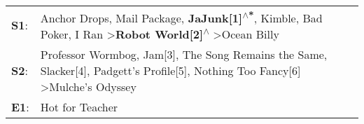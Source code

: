 \begin{supertabular}{p{0.03\textwidth}p{0.92\textwidth}}
 \textbf{S1}:  &  Anchor Drops\textsuperscript{}, \enspace Mail Package\textsuperscript{}, \enspace \textbf{JaJunk[1]\textsuperscript{$\wedge$*}}, \enspace Kimble\textsuperscript{}, \enspace Bad Poker\textsuperscript{}, \enspace I Ran\textsuperscript{} \textgreater \enspace \textbf{Robot World[2]\textsuperscript{$\wedge$}} \textgreater \enspace Ocean Billy\textsuperscript{}  \enspace  \\
 \textbf{S2}:  &                                          Professor Wormbog\textsuperscript{}, \enspace Jam[3]\textsuperscript{}, \enspace The Song Remains the Same\textsuperscript{}, \enspace Slacker[4]\textsuperscript{}, \enspace Padgett's Profile[5]\textsuperscript{}, \enspace Nothing Too Fancy[6]\textsuperscript{} \textgreater \enspace Mulche's Odyssey\textsuperscript{}  \enspace  \\
 \textbf{E1}:  &                                                                                                                                                                                                                                                                                                                                       Hot for Teacher\textsuperscript{}  \enspace  \\
\end{supertabular}
